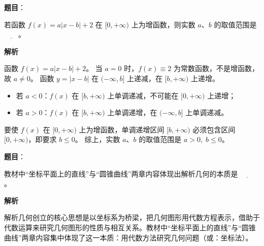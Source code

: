 \begin{answer}

\textbf{题目}：

若函数 $f(x) = a|x - b| + 2$ 在 $[0, +\infty)$ 上为增函数，则实数 $a$、$b$ 的取值范围是 $\underline{\qquad}$。

\textbf{解析}

函数 $f(x) = a|x - b| + 2$。
当 $a = 0$ 时，$f(x) \equiv 2$ 为常数函数，不是增函数，故 $a \ne 0$。
函数 $y = |x - b|$ 在 $(-\infty, b]$ 上递减，在 $[b, +\infty)$ 上递增。
\begin{itemize}
\item 若 $a < 0$：$f(x)$ 在 $[b, +\infty)$ 上单调递减，不可能在 $[0, +\infty)$ 上递增；
\item 若 $a > 0$：$f(x)$ 在 $[b, +\infty)$ 上单调递增，在 $(-\infty, b]$ 上单调递减。
\end{itemize}

要使 $f(x)$ 在 $[0, +\infty)$ 上为增函数，单调递增区间 $[b, +\infty)$ 必须包含区间 $[0, +\infty)$，即要求 $b \leqslant 0$。
综上，实数 $a$、$b$ 的取值范围是 $a > 0,\; b \leqslant 0$。


\end{answer}
\begin{answer}

\textbf{题目}：

教材中“坐标平面上的直线”与“圆锥曲线”两章内容体现出解析几何的本质是 $\underline{\qquad}$。

\textbf{解析}

解析几何创立的核心思想是以坐标系为桥梁，把几何图形用代数方程表示，借助于代数运算来研究几何图形的性质与相互关系。教材中“坐标平面上的直线”与“圆锥曲线”两章内容集中体现了这一本质：用代数方法研究几何问题（或：坐标法）。


\end{answer}
